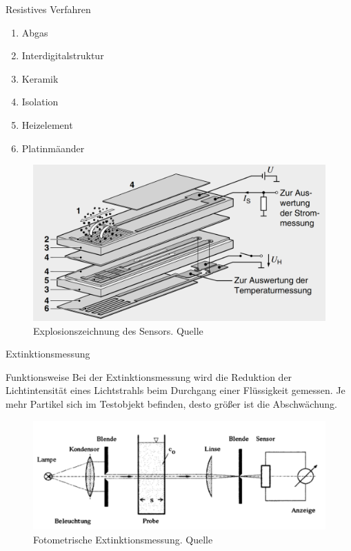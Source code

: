 \documentclass{beamer}
\begin{document}
	\begin{frame}{Resistives Verfahren}
	\begin{multicols}{2}
		\begin{enumerate}
			\item Abgas
			\item Interdigitalstruktur
			\item Keramik
			\item Isolation
			\item Heizelement
			\item Platinmäander
		\end{enumerate}
		\begin{figure}
			\includegraphics[width=0.75\textheight]{feld.pdf}
			\caption{\footnotesize{Explosionszeichnung des Sensors. Quelle\cite{feld}}}
		\end{figure}
	\end{multicols}
	\end{frame}

	\begin{frame}{Extinktionsmessung}
		\begin{block}{Funktionsweise}
			\footnotesize Bei der Extinktionsmessung wird die Reduktion der Lichtintensität eines Lichtstrahls beim Durchgang einer Flüssigkeit gemessen. Je mehr Partikel sich im Testobjekt befinden, desto größer ist die Abschwächung.
			\begin{figure}
				\includegraphics[width=\textheight]{extinktion.pdf}
				\caption{\footnotesize{Fotometrische Extinktionsmessung. Quelle\cite{messtechniken}}}
			\end{figure}
		\end{block}
	\end{frame}
\end{document}
